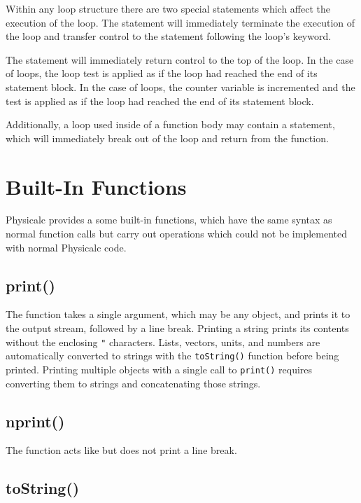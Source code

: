 Within any loop structure there are two special statements which
affect the execution of the loop.  The  statement will
immediately terminate the execution of the loop and transfer control
to the statement following the loop's  keyword.  

The  statement will immediately return control to the top of
the loop.  In the case of  loops, the loop test is applied
as if the loop had reached the end of its statement block.  In the
case of  loops, the counter variable is incremented and the test
is applied as if the loop had reached the end of its statement block.

Additionally, a loop used inside of a function body may contain a
 statement, which will immediately break out of the loop
and return from the function.



\section{Built-In Functions}
\label{builtins}

Physicalc provides a some built-in functions, which have the same
syntax as normal function calls but carry out operations which could
not be implemented with normal Physicalc code.

\subsection{print()}

The  function takes a single argument, which may be any
object, and prints it to the output stream, followed by a line break.
Printing a string prints its contents without the enclosing \verb|"|
characters.  Lists, vectors, units, and numbers are automatically
converted to strings with the \verb|toString()| function before being
printed.  Printing multiple objects with a single call to
\verb|print()| requires converting them to strings and concatenating
those strings.

\subsection{nprint()}

The  function acts like  but does not print
a line break.

\subsection{toString()}


